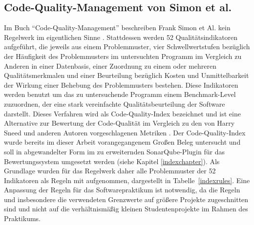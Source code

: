 \documentclass[da,ngerman]{stthesis}
\begin{document}
			\subsection{Code-Quality-Management von Simon et al.} \label{cqirules}
				Im Buch "`Code-Quality-Management"' beschreiben Frank Simon et Al. kein Regelwerk im eigentlichen Sinne \cite{CodeQualityManagement}. Stattdessen werden 52 Qualitätsindikatoren aufgeführt, die jeweils aus einem Problemmuster, vier Schwellwertstufen bezüglich der Häufigkeit des Problemmusters im untersuchten Programm im Vergleich zu Anderen in einer Datenbasis, einer Zuordnung zu einem oder mehreren Qualitätsmerkmalen und einer Beurteilung bezüglich Kosten und Unmittelbarkeit der Wirkung einer Behebung des Problemmusters bestehen. Diese Indikatoren werden benutzt um das zu untersuchende Programm einem Benchmark-Level zuzuordnen, der eine stark vereinfachte Qualitätsbeurteilung der Software darstellt. Dieses Verfahren wird als Code-Quality-Index bezeichnet und ist eine Alternative zur Bewertung der Code-Qualität im Vergleich zu den von Harry Sneed und anderen Autoren vorgeschlagenen Metriken \cite{SoftwareInZahlen}. \newline
				Der Code-Quality-Index wurde bereits im dieser Arbeit vorangegangenem Großen Beleg untersucht \cite{grosserBeleg} und soll in abgewandelter Form im zu erweiternden SonarQube-Plugin für das Bewertungssystem umgesetzt werden (siehe Kapitel \ref{indexchapter}). Als Grundlage wurden für das Regelwerk daher alle Problemmuster der 52 Indikatoren als Regeln mit aufgenommen, dargestellt in Tabelle~\ref{indexrules}. Eine Anpassung der Regeln für das Softwarepraktikum ist notwendig, da die Regeln und insbesondere die verwendeten Grenzwerte auf größere Projekte zugeschnitten sind und nicht auf die verhältnismäßig kleinen Studentenprojekte im Rahmen des Praktikums. 
\end{document}
